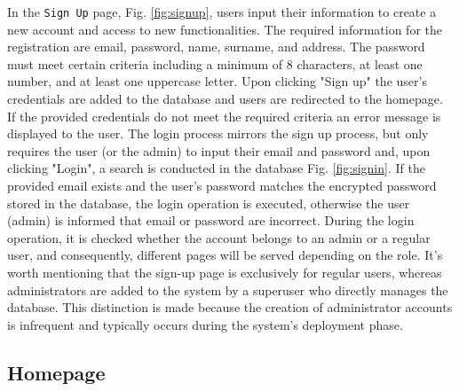 In the \texttt{Sign Up} page, Fig. \ref{fig:signup}, users input their information to create a new account and access to new functionalities. The required information for the registration are email, password, name, surname, and address. The password must meet certain criteria including a minimum of 8 characters, at least one number, and at least one uppercase letter. Upon clicking "Sign up" the user's credentials are added to the database and users are redirected to the homepage. If the provided credentials do not meet the required criteria an error message is displayed to the user. The login process mirrors the sign up process, but only requires the user (or the admin) to input their email and password and, upon clicking "Login", a search is conducted in the database Fig. \ref{fig:signin}. If the provided email exists and the user's password matches the encrypted password stored in the database, the login operation is executed, otherwise the user (admin) is informed that email or password are incorrect. During the login operation, it is checked whether the account belongs to an admin or a regular user, and consequently, different pages will be served depending on the role. It's worth mentioning that the sign-up page is exclusively for regular users, whereas administrators are added to the system by a superuser who directly manages the database. This distinction is made because the creation of administrator accounts is infrequent and typically occurs during the system's deployment phase.

\subsection{Homepage}

